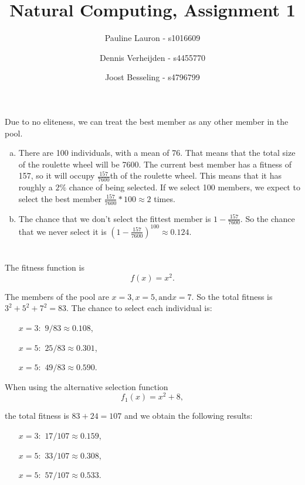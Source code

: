 \documentclass[11pt]{article}
\title{Natural Computing, Assignment 1}
\author{Pauline Lauron - s1016609 \and Dennis Verheijden - s4455770 \and Joost Besseling - s4796799}
\begin{document}
	\maketitle
	
	\section{}
	Due to no eliteness, we can treat the best member as any other member in the pool.
	
	\begin{enumerate}[(a)]
		\item There are 100 individuals, with a mean of 76. That means that the total size of the roulette wheel will be 7600. The current best member has a fitness of 157, so it will occupy $\frac{157}{7600}$th of the roulette wheel. This means that it has roughly a $2\%$ chance of being selected. If we select 100 members, we expect to select the best member $\frac{157}{7600} * 100 \approx 2 $ times.
		
		\item The chance that we don't select the fittest member is $1 - \frac{157}{7600}$. So the chance that we never select it is $\left(1 - \frac{157}{7600}\right)^{100} \approx 0.124$.
	\end{enumerate}

	\section{}
	
	The fitness function is \[ f(x) = x^2. \]
	
	The members of the pool are $x=3, x=5, \text{and} x=7$. So the total fitness is $3^2 + 5^2 + 7^2 = 83$. The chance to select each individual is: 
	\begin{itemize}
		\item[$x=3:$] $9/83 \approx 0.108$,
		
		\item[$x=5:$] $25/83 \approx 0.301$,
		
		\item[$x=5:$] $49/83 \approx 0.590$.
		 
	\end{itemize}

	When using the alternative selection function 
	\[
		f_1(x) = x^2 + 8,
	\] 
	
	the total fitness is $83 + 24 = 107$ and
	we obtain the following results: 
	
		\begin{itemize}
		\item[$x=3:$] $17/107 \approx 0.159$,
		
		\item[$x=5:$] $33/107 \approx 0.308$,
		
		\item[$x=5:$] $57/107 \approx 0.533$.
		
	\end{itemize}
\end{document}
